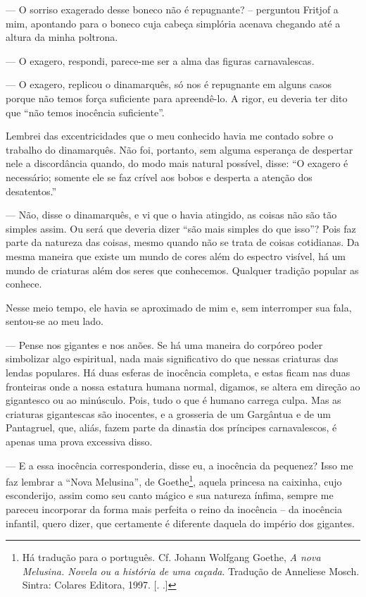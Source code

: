 --- O sorriso exagerado desse boneco não é repugnante? -- perguntou
Fritjof a mim, apontando para o boneco cuja cabeça simplória acenava
chegando até a altura da minha poltrona.

--- O exagero, respondi, parece-me ser a alma das figuras carnavalescas.

--- O exagero, replicou o dinamarquês, só nos é repugnante em alguns
casos porque não temos força suficiente para apreendê-lo. A rigor, eu
deveria ter dito que ``não temos inocência suficiente''.

Lembrei das excentricidades que o meu conhecido havia me contado sobre o
trabalho do dinamarquês. Não foi, portanto, sem alguma esperança de
despertar nele a discordância quando, do modo mais natural possível,
disse: ``O exagero é necessário; somente ele se faz crível aos bobos e
desperta a atenção dos desatentos.''

--- Não, disse o dinamarquês, e vi que o havia atingido, as coisas não
são tão simples assim. Ou será que deveria dizer ``são mais simples do
que isso''? Pois faz parte da natureza das coisas, mesmo quando não se
trata de coisas cotidianas. Da mesma maneira que existe um mundo de
cores além do espectro visível, há um mundo de criaturas além dos seres
que conhecemos. Qualquer tradição popular as conhece.

Nesse meio tempo, ele havia se aproximado de mim e, sem interromper sua
fala, sentou-se ao meu lado.

--- Pense nos gigantes e nos anões. Se há uma maneira do corpóreo poder
simbolizar algo espiritual, nada mais significativo do que nessas
criaturas das lendas populares. Há duas esferas de inocência completa, e
estas ficam nas duas fronteiras onde a nossa estatura humana normal,
digamos, se altera em direção ao gigantesco ou ao minúsculo. Pois, tudo
o que é humano carrega culpa. Mas as criaturas gigantescas são
inocentes, e a grosseria de um Gargântua e de um Pantagruel, que, aliás,
fazem parte da dinastia dos príncipes carnavalescos, é apenas uma prova
excessiva disso.

--- E a essa inocência corresponderia, disse eu, a inocência da pequenez?
Isso me faz lembrar a ``Nova Melusina'', de Goethe\footnote{Há tradução
  para o português. Cf. Johann Wolfgang Goethe, \emph{A nova Melusina.
  Novela ou a história de uma caçada}. Tradução de Anneliese Mosch.
  Sintra: Colares Editora, 1997. [. .]}, aquela princesa na
caixinha, cujo esconderijo, assim como seu canto mágico e sua natureza
ínfima, sempre me pareceu incorporar da forma mais perfeita o reino da
inocência -- da inocência infantil, quero dizer, que certamente é
diferente daquela do império dos gigantes.

